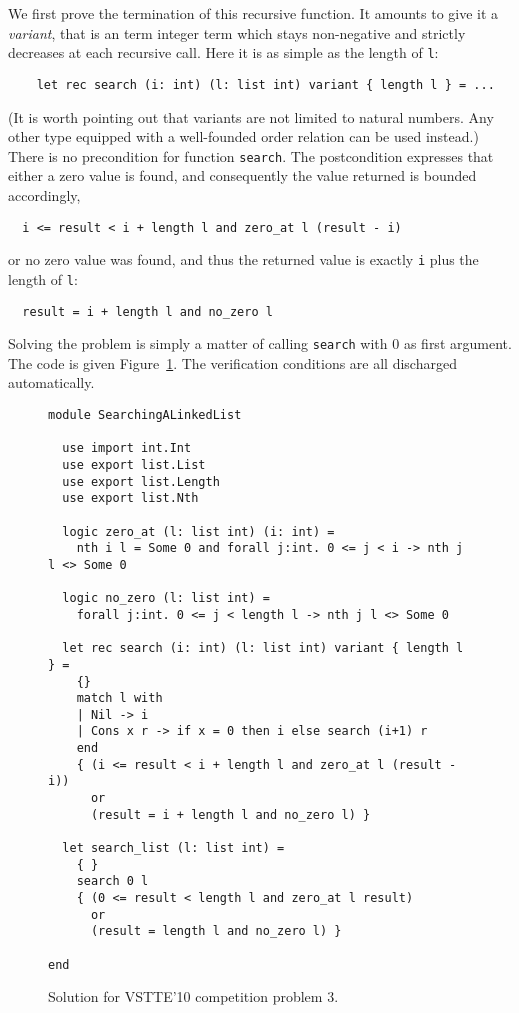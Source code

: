 We first prove the termination of this recursive function. It amounts
to give it a \emph{variant}, that is an term integer term which stays
non-negative and strictly decreases at each recursive call. Here it is
as simple as the length of \texttt{l}:
\begin{verbatim}
    let rec search (i: int) (l: list int) variant { length l } = ...
\end{verbatim}
(It is worth pointing out that variants are not limited to natural
numbers. Any other type equipped with a well-founded order relation
can be used instead.)
There is no precondition for function \texttt{search}.
The postcondition expresses that either a zero value is found, and
consequently the value returned is bounded accordingly,
\begin{verbatim}
  i <= result < i + length l and zero_at l (result - i)
\end{verbatim}
or no zero value was found, and thus the returned value is exactly
\texttt{i} plus the length of \texttt{l}:
\begin{verbatim}
  result = i + length l and no_zero l
\end{verbatim}
Solving the problem is simply a matter of calling \texttt{search} with
0 as first argument.
The code is given Figure~\ref{fig:LinkedList}. The verification
conditions are all discharged automatically.
\begin{figure}
  \centering
\begin{verbatim}
module SearchingALinkedList

  use import int.Int
  use export list.List
  use export list.Length
  use export list.Nth

  logic zero_at (l: list int) (i: int) =
    nth i l = Some 0 and forall j:int. 0 <= j < i -> nth j l <> Some 0

  logic no_zero (l: list int) =
    forall j:int. 0 <= j < length l -> nth j l <> Some 0

  let rec search (i: int) (l: list int) variant { length l } =
    {}
    match l with
    | Nil -> i
    | Cons x r -> if x = 0 then i else search (i+1) r
    end
    { (i <= result < i + length l and zero_at l (result - i))
      or
      (result = i + length l and no_zero l) }

  let search_list (l: list int) =
    { }
    search 0 l
    { (0 <= result < length l and zero_at l result)
      or
      (result = length l and no_zero l) }

end
\end{verbatim}
\vspace*{-2em}\hrulefill
  \caption{Solution for VSTTE'10 competition problem 3.}
  \label{fig:LinkedList}
\end{figure}


